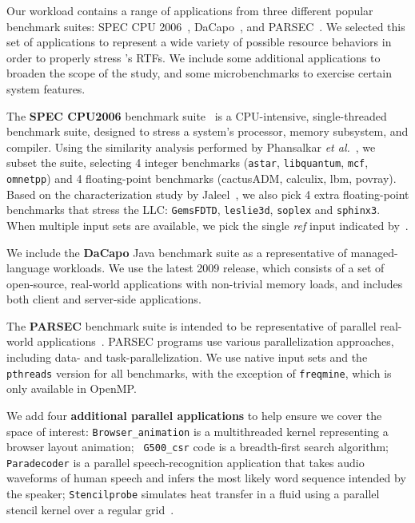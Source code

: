 Our workload contains a range of applications from three different
popular benchmark suites: SPEC CPU 2006~\cite{SPEC2006},
DaCapo~\cite{dacapo}, and PARSEC~\cite{parsec}. We selected this set of applications to represent a wide variety of possible resource behaviors in order to properly stress \pacora's RTFs. We include some additional applications to broaden the
scope of the study, and some microbenchmarks to exercise certain
system features.

The \textbf{SPEC CPU2006} benchmark suite~\cite{SPEC2006} is a
CPU-intensive, single-threaded benchmark suite, designed to stress a
system's processor, memory subsystem, and compiler.  Using the
similarity analysis performed by Phansalkar \emph{et
al.}~\cite{Phansalkar:ISCA2007}, we subset the suite, selecting 4
integer benchmarks ({\tt astar}, {\tt libquantum}, {\tt mcf}, {\tt omnetpp}) and 4
floating-point benchmarks (cactusADM, calculix, lbm, povray).  Based
on the characterization study by Jaleel~\cite{Jaleel:TR2007}, we also
pick 4 extra floating-point benchmarks that stress the LLC: {\tt GemsFDTD},
{\tt leslie3d}, {\tt soplex} and {\tt sphinx3}.  When multiple input sets are
available, we pick the single \textit{ref} input indicated by~\cite{Phansalkar:ISCA2007}.

We include the \textbf{DaCapo} Java benchmark suite as a
representative of managed-language workloads. We use the latest 2009 release, which consists of a set of open-source, real-world
applications with non-trivial memory loads, and includes both client and
server-side applications.

The \textbf{PARSEC} benchmark suite is intended to be representative
of parallel real-world applications~\cite{parsec}. PARSEC
programs use various parallelization approaches, including data- and
task-parallelization. We use native input sets and the {\tt pthreads} version for all benchmarks, with the exception of
\texttt{freqmine}, which is only available in OpenMP.

We add four \textbf{additional parallel applications} to help ensure
we cover the space of interest: {\tt Browser\_animation} is a
multithreaded kernel representing a browser layout animation; {\tt
  G500\_csr} code is a breadth-first search algorithm; {\tt Paradecoder} is a parallel
speech-recognition application that takes audio waveforms of human
speech and infers the most likely word sequence intended by the
speaker; {\tt Stencilprobe} simulates heat transfer in a fluid
using a parallel stencil kernel over a regular
grid~\cite{Kamil:Stencilprobe}.


